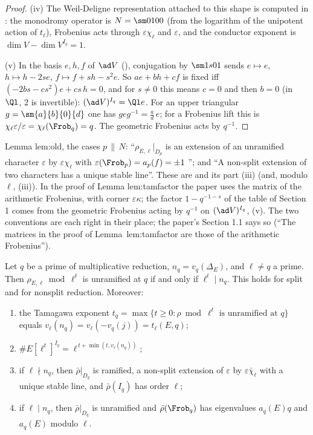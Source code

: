 \begin{proof}
(iv) The Weil-Deligne representation attached to this shape is computed in : the monodromy operator is $N=\sm0100$ (from the
logarithm of the unipotent action of $t_\ell$), Frobenius acts through $\varepsilon\chi_\ell$ and $\varepsilon$, and the conductor exponent is
$\dim V-\dim V^{I_q}=1$.

(v) In the basis $e,h,f$ of $\ad V$ (), conjugation by $\sm1s01$ sends $e\mapsto e$, $h\mapsto h-2se$, $f\mapsto f+sh-s^2e$. So
$ae+bh+cf$ is fixed iff $(-2bs-cs^2)e+cs\,h=0$, and for $s\ne0$ this means $c=0$ and then $b=0$ (in $\Ql$, $2$ is invertible):
$(\ad V)^{I_q}=\Ql e$. For an upper triangular $g=\sm{a}{b}{0}{d}$ one has $geg^{-1}=\frac ad\,e$; for a Frobenius lift this is $\chi_\ell\varepsilon/\varepsilon=\chi_\ell(\Frob_q)=q$.
The geometric Frobenius acts by $q^{-1}$.
\end{proof}

\begin{paperlink}
Lemma lem:old, the cases $p\,\|\,N$: ``$\rho_{E,\ell}|_{D_p}$ is an extension of an unramified character $\varepsilon$ by $\varepsilon\chi_\ell$ with
$\varepsilon(\Frob_p)=a_p(f)=\pm1$ \cite[Theorem 3.1(e)]{DDT}''; and ``A non-split extension of two characters has a unique stable line''. These are
 and its part (iii) (and, modulo $\ell$, (iii)). In the proof of Lemma lem:tamfactor
the paper uses the matrix of the arithmetic Frobenius, with corner $\varepsilon\kappa$; the factor $1-q^{-1-s}$ of the table of Section 1 comes from
the geometric Frobenius acting by $q^{-1}$ on $(\ad V)^{I_q}$, (v). The two conventions are each right in their place; the paper's
Section 1.1 says so (``The matrices in the proof of Lemma~lem:tamfactor are those of the arithmetic Frobenius'').
\end{paperlink}

\begin{lemma}\label{lem:galrep:tamagawa-exp}
Let $q$ be a prime of multiplicative reduction, $n_q=v_q(\Delta_E)$, and $\ell\ne q$ a prime. Then $\rho_{E,\ell}\bmod\ell^t$ is unramified at $q$ if and only
if $\ell^t\mid n_q$. This holds for split and for nonsplit reduction. Moreover:
\begin{enumerate}[label=(\roman*)]
\item the Tamagawa exponent $t_q=\max\{t\ge0:\rho\bmod\ell^t\text{ is unramified at }q\}$ equals $v_\ell(n_q)=v_\ell(-v_q(j))=t_\ell(E,q)$;
\item $\#E[\ell^t]^{I_q}=\ell^{\,t+\min(t,v_\ell(n_q))}$;
\item if $\ell\nmid n_q$, then $\bar\rho|_{D_q}$ is ramified, a non-split extension of $\varepsilon$ by $\varepsilon\bar\chi_\ell$ with a unique stable line, and
$\bar\rho(I_q)$ has order $\ell$;
\item if $\ell\mid n_q$, then $\bar\rho|_{D_q}$ is unramified and $\bar\rho(\Frob_q)$ has eigenvalues $a_q(E)q$ and $a_q(E)$ modulo $\ell$.
\end{enumerate}
\end{lemma}

